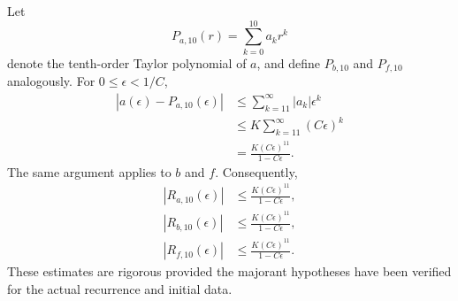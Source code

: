 \documentclass[11pt,letterpaper]{article}
\begin{document}
Let
\[
P_{a,10}(r)=\sum_{k=0}^{10}a_k r^k
\]
denote the tenth-order Taylor polynomial of \(a\), and
define \(P_{b,10}\) and \(P_{f,10}\) analogously. For
\(0\le\epsilon<1/C\),
\begin{align*}
|a(\epsilon)-P_{a,10}(\epsilon)|
&\le \sum_{k=11}^{\infty}|a_k|\epsilon^k\\
&\le K\sum_{k=11}^{\infty}(C\epsilon)^k\\
&=\frac{K(C\epsilon)^{11}}{1-C\epsilon}.
\end{align*}
The same argument applies to \(b\) and \(f\). Consequently,
\[
\boxed{
\begin{aligned}
|R_{a,10}(\epsilon)|&\le
\frac{K(C\epsilon)^{11}}{1-C\epsilon},\\
|R_{b,10}(\epsilon)|&\le
\frac{K(C\epsilon)^{11}}{1-C\epsilon},\\
|R_{f,10}(\epsilon)|&\le
\frac{K(C\epsilon)^{11}}{1-C\epsilon}.
\end{aligned}
}
\]
These estimates are rigorous provided the majorant hypotheses
have been verified for the actual recurrence and initial data.

\end{document}
